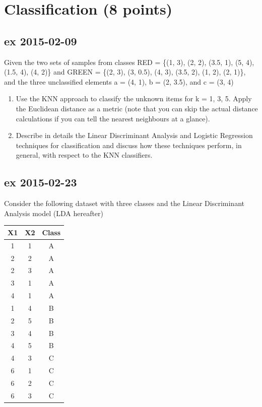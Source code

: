 \documentclass[a4paper,12pt,titlepage]{article} %
\begin{document}
\section{Classification (8 points)}
\subsection{ex 2015-02-09}
Given the two sets of samples from classes RED = \{(1, 3), (2, 2), (3.5, 1), (5, 4), (1.5, 4), (4, 2)\} and GREEN = \{(2, 3), (3, 0.5), (4, 3), (3.5, 2), (1, 2), (2, 1)\}, and the three unclassified elements a = (4, 1), b = (2, 3.5), and c = (3, 4)
\begin{enumerate}
\item Use the KNN approach to classify the unknown items for k = 1, 3, 5. Apply the Euclidean distance as a metric (note that you can skip the actual distance calculations if you can tell the nearest neighbours at a glance).
\item Describe in details the Linear Discriminant Analysis and Logistic Regression techniques for classification and discuss how these techniques perform, in general, with respect to the KNN classifiers.
\end{enumerate}

\subsection{ex 2015-02-23}
Consider the following dataset with three classes and the Linear Discriminant Analysis
model (LDA hereafter)
\begin{center}
  \begin{tabular}{cc|c}
    X1 & X2  & Class \\
    \hline
    \hline
    1 & 1 & A \\
    2 & 2 & A \\
    2 & 3 & A \\
    3 & 1 & A \\
    4 & 1 & A \\
    \hline
    1 & 4 & B \\
    2 & 5 & B \\
    3 & 4 & B \\
    4 & 5 & B \\
    \hline
    4 & 3 & C \\
    6 & 1 & C \\
    6 & 2 & C \\
    6 & 3 & C \\
    \hline
  \end{tabular}
\end{center}
\end{document}
